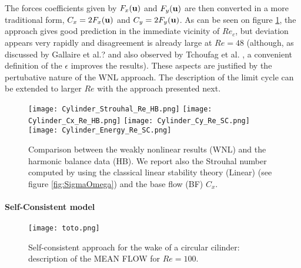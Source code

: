 \documentclass[twocolumn,10pt]{asme2ej}
\begin{document}
{\color{red} 
The forces coefficients given by $F_x({\bf u})$ and $F_y({\bf u})$ are then converted in a more traditional form, $C_x=2F_x({\bf u})$ and $C_y=2F_y({\bf u})$.
}
As can be seen on figure \ref{fig:HB_SC_DATA_COMP},  the approach gives good prediction in the immediate vicinity of $Re_c$, but deviation appears very rapidly and disagreement is already large at $Re=48$ (although, as discussed by Gallaire et al.? and also observed by Tchoufag et al. \cite{Tchoufag2015}, a convenient definition of the $\epsilon$ improves the results). {\color{red} These aspects are justified by the pertubative nature of the WNL approach. The description of the limit cycle can be extended to larger $Re$ with the approach presented next.  }

\begin{figure}
\begin{center}
\texttt{[image: Cylinder\_Strouhal\_Re\_HB.png]}
\texttt{[image: Cylinder\_Cx\_Re\_HB.png]}
\texttt{[image: Cylinder\_Cy\_Re\_SC.png]}
\texttt{[image: Cylinder\_Energy\_Re\_SC.png]}
\end{center}
\caption{Comparison between the weakly nonlinear results (WNL) and the harmonic balance data (HB). We report also the Strouhal number computed by using the classical {\color{red} linear stability theory (Linear) (see figure \ref{fig:SigmaOmega})} and the base flow (BF) $C_x$.
}
\label{fig:HB_SC_DATA_COMP}
\end{figure}


\paragraph{ {\color{red} Self-Consistent model}}


\begin{figure}
\begin{center}
\texttt{[image: toto.png]}
\end{center}
\caption{Self-consistent approach for the wake of a circular cilinder:  description of the MEAN FLOW for  $Re = 
100$.}
\label{fig:MF60}
\end{figure}
\end{document}
